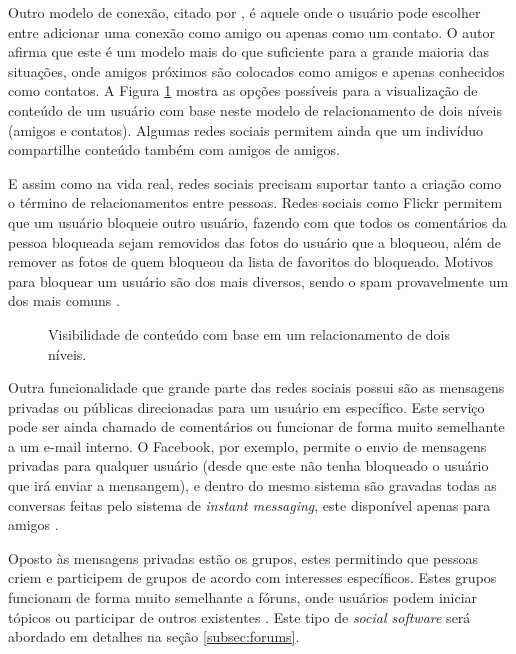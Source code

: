 \documentclass[diss]{template/setrem}
\begin{document}
Outro modelo de conexão, citado por \citet{Bell2009}, é aquele onde o usuário pode escolher entre adicionar uma conexão como amigo ou apenas como um contato. O autor afirma que este é um modelo mais do que suficiente para a grande maioria das situações, onde amigos próximos são colocados como amigos e apenas conhecidos como contatos. A Figura \ref{fig:content-visibility} mostra as opções possíveis para a visualização de conteúdo de um usuário com base neste modelo de relacionamento de dois níveis (amigos e contatos). Algumas redes sociais permitem ainda que um indivíduo compartilhe conteúdo também com amigos de amigos.

E assim como na vida real, redes sociais precisam suportar tanto a criação como o término de relacionamentos entre pessoas. Redes sociais como Flickr permitem que um usuário bloqueie outro usuário, fazendo com que todos os comentários da pessoa bloqueada sejam removidos das fotos do usuário que a bloqueou, além de remover as fotos de quem bloqueou da lista de favoritos do bloqueado. Motivos para bloquear um usuário são dos mais diversos, sendo o spam provavelmente um dos mais comuns \citep{Bell2009}.

\begin{figure}[!h]
    \caption{Visibilidade de conteúdo com base em um relacionamento de dois níveis.}
    \label{fig:content-visibility}
\end{figure}

Outra funcionalidade que grande parte das redes sociais possui são as mensagens privadas ou públicas direcionadas para um usuário em específico. Este serviço pode ser ainda chamado de comentários ou funcionar de forma muito semelhante a um e-mail interno. O Facebook, por exemplo, permite o envio de mensagens privadas para qualquer usuário (desde que este não tenha bloqueado o usuário que irá enviar a mensangem), e dentro do mesmo sistema são gravadas todas as conversas feitas pelo sistema de \emph{instant messaging}, este disponível apenas para amigos \citep{Facebook2012, ChildnetInternational2008}.

Oposto às mensagens privadas estão os grupos, estes permitindo que pessoas criem e participem de grupos de acordo com interesses específicos. Estes grupos funcionam de forma muito semelhante a fóruns, onde usuários podem iniciar tópicos ou participar de outros existentes \citep{Farkas2007}. Este tipo de \emph{social software} será abordado em detalhes na seção \ref{subsec:forums}.
\end{document}
